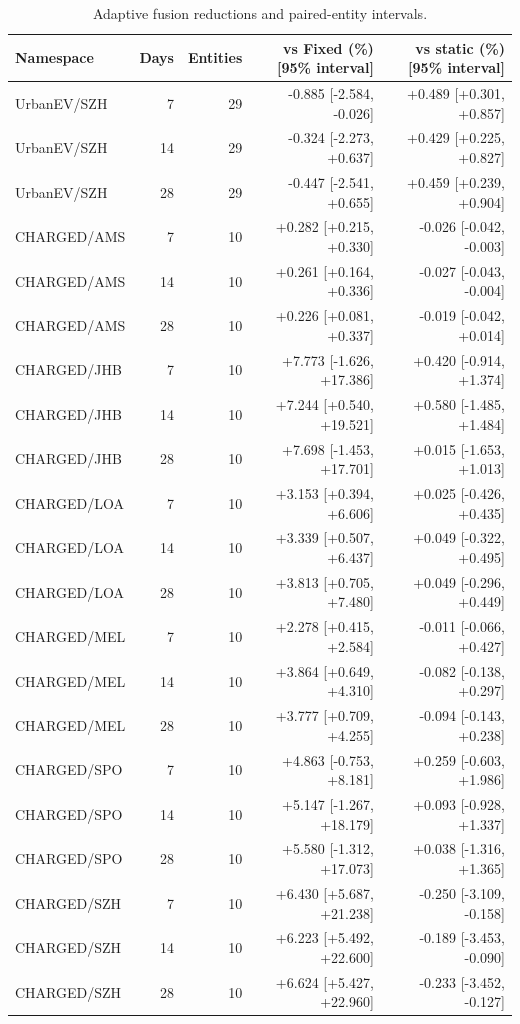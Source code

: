 \begin{table}[t]
\centering\footnotesize
\caption{Adaptive fusion reductions and paired-entity intervals.}\label{tab:uncertaintyall}
\begin{tabular*}{\textwidth}{@{\extracolsep{\fill}}lrrrr@{}}\toprule
Namespace & Days & Entities & vs Fixed (\%) [95\% interval] & vs static (\%) [95\% interval]\\\midrule
UrbanEV/SZH & 7 & 29 & -0.885 [-2.584, -0.026] & +0.489 [+0.301, +0.857]\\
UrbanEV/SZH & 14 & 29 & -0.324 [-2.273, +0.637] & +0.429 [+0.225, +0.827]\\
UrbanEV/SZH & 28 & 29 & -0.447 [-2.541, +0.655] & +0.459 [+0.239, +0.904]\\
CHARGED/AMS & 7 & 10 & +0.282 [+0.215, +0.330] & -0.026 [-0.042, -0.003]\\
CHARGED/AMS & 14 & 10 & +0.261 [+0.164, +0.336] & -0.027 [-0.043, -0.004]\\
CHARGED/AMS & 28 & 10 & +0.226 [+0.081, +0.337] & -0.019 [-0.042, +0.014]\\
CHARGED/JHB & 7 & 10 & +7.773 [-1.626, +17.386] & +0.420 [-0.914, +1.374]\\
CHARGED/JHB & 14 & 10 & +7.244 [+0.540, +19.521] & +0.580 [-1.485, +1.484]\\
CHARGED/JHB & 28 & 10 & +7.698 [-1.453, +17.701] & +0.015 [-1.653, +1.013]\\
CHARGED/LOA & 7 & 10 & +3.153 [+0.394, +6.606] & +0.025 [-0.426, +0.435]\\
CHARGED/LOA & 14 & 10 & +3.339 [+0.507, +6.437] & +0.049 [-0.322, +0.495]\\
CHARGED/LOA & 28 & 10 & +3.813 [+0.705, +7.480] & +0.049 [-0.296, +0.449]\\
CHARGED/MEL & 7 & 10 & +2.278 [+0.415, +2.584] & -0.011 [-0.066, +0.427]\\
CHARGED/MEL & 14 & 10 & +3.864 [+0.649, +4.310] & -0.082 [-0.138, +0.297]\\
CHARGED/MEL & 28 & 10 & +3.777 [+0.709, +4.255] & -0.094 [-0.143, +0.238]\\
CHARGED/SPO & 7 & 10 & +4.863 [-0.753, +8.181] & +0.259 [-0.603, +1.986]\\
CHARGED/SPO & 14 & 10 & +5.147 [-1.267, +18.179] & +0.093 [-0.928, +1.337]\\
CHARGED/SPO & 28 & 10 & +5.580 [-1.312, +17.073] & +0.038 [-1.316, +1.365]\\
CHARGED/SZH & 7 & 10 & +6.430 [+5.687, +21.238] & -0.250 [-3.109, -0.158]\\
CHARGED/SZH & 14 & 10 & +6.223 [+5.492, +22.600] & -0.189 [-3.453, -0.090]\\
CHARGED/SZH & 28 & 10 & +6.624 [+5.427, +22.960] & -0.233 [-3.452, -0.127]\\
\bottomrule\end{tabular*}\end{table}

